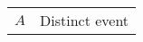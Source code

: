 \begin{table}[h]
    \begin{tabular}{@{}ll@{}}%
        \( A \) & Distinct event\\
    \end{tabular}
    \label{tab:glossar}
\end{table}